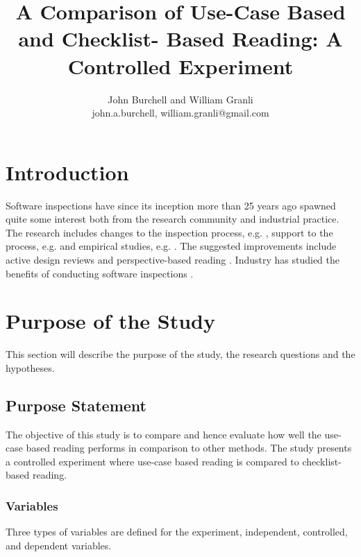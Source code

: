 \documentclass[10pt,twocolumn]{article}
\begin{document}
\title{A Comparison of Use-Case Based and Checklist-
Based Reading: A Controlled Experiment}

\author{John Burchell and William Granli \\
john.a.burchell, william.granli@gmail.com}


\maketitle
\thispagestyle{empty}


\section{Introduction}
Software inspections have since its inception \cite{fagan2002design} more than
25 years ago spawned quite some interest both from the
research community and industrial practice. The research
includes changes to the inspection process, e.g. \cite{bisant1989two}, support to
the process, e.g. \cite{basili1996empirical} and empirical studies, e.g. \cite{basili1999building}. The
suggested improvements include active design reviews \cite{parnas1985active} and
perspective-based reading \cite{shull2000perspective}. Industry has studied the
benefits of conducting software inspections \cite{weller1993lessons}.

\section{Purpose of the Study}
This section will describe the purpose of the study, the research questions and the hypotheses. 

\subsection{Purpose Statement}
The objective of this study is to compare and hence
evaluate how well the use-case based reading performs in
comparison to other methods. The study presents a controlled
experiment where use-case based reading is compared to
checklist-based reading.

\subsubsection{Variables}
Three types of variables are defined for the experiment,
independent, controlled, and dependent variables.
\end{document}
